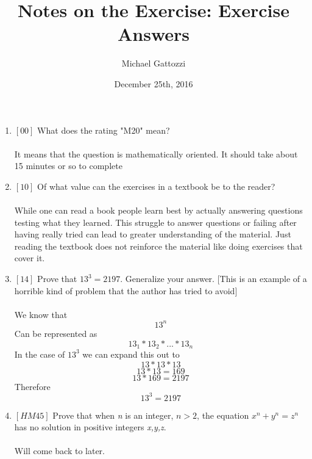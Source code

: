 \documentclass {article}
\title{Notes on the Exercise: Exercise Answers}
\date{December 25th, 2016}
\author{Michael Gattozzi}
\begin{document}
\maketitle
\begin{enumerate}
  \item $[00]$ What does the rating "M20" mean?
    \\\\
    It means that the question is mathematically oriented. It should
    take about 15 minutes or so to complete
  \item $[10]$ Of what value can the exercises in a textbook be to the reader?
    \\\\
    While one can read a book people learn best by actually answering questions
    testing what they learned. This struggle to answer questions or failing
    after having really tried can lead to greater understanding of the material.
    Just reading the textbook does not reinforce the material like doing
    exercises that cover it.
  \item $[14]$ Prove that $\displaystyle 13^3 = 2197 $. Generalize your answer.
    $[$This is an example of a horrible kind of problem that the author has
    tried to avoid$]$
    \\\\
    We know that \[13^n \]
    Can be represented as \[13_1 * 13_2 * ... * 13_n\]
    In the case of $\displaystyle 13^3 $ we can expand this out to
    \[13 * 13 * 13\]
    \[13 * 13 = 169\]
    \[13 * 169 = 2197\]
    Therefore \[13^3 = 2197\]

  \item $[HM45]$ Prove that when \textit{n} is an integer, $\displaystyle n>2 $,
    the equation $\displaystyle x^n + y^n = z^n $ has no solution in positive
    integers \textit{x,y,z}.
    \\\\ Will come back to later.
\end{enumerate}
\end{document}
